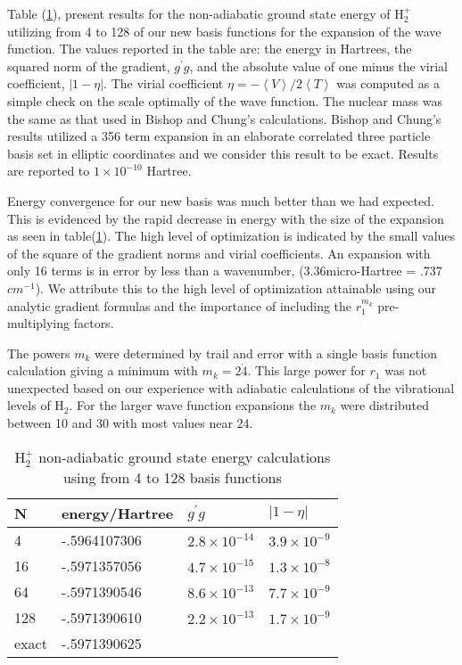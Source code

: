 \documentclass[12pt]{article}
\begin{document}
Table (\ref{H2pRes}),  present results for the non-adiabatic ground state
energy of H$_{2}^{+}$ utilizing from 4 to 128 of our new basis functions for
the expansion of the wave function.  The values reported in the table are: the
energy in Hartrees, the squared norm of the gradient, $g^{\prime}g$, and the
absolute value of one minus the virial coefficient, $\left|  1-\eta\right|  $.
The virial coefficient $\eta=-\left\langle V\right\rangle /2\left\langle
T\right\rangle $ was computed as a simple check on the scale optimally of the
wave function.  The nuclear mass was the same as that used in Bishop and
Chung's\cite{Bishop77} calculations. Bishop and Chung's results utilized a 356
term expansion in an elaborate correlated three particle basis set in elliptic
coordinates and we consider this result to be exact. Results are reported to
$1\times10^{-10}$ Hartree.

Energy convergence for our new basis was much better than we had expected.
This is evidenced by the rapid decrease in energy with the size of the
expansion as seen in table(\ref{H2pRes}). The high level of optimization is
indicated by the small values of the square of the gradient norms and virial
coefficients.  An expansion with only 16 terms is in error by less than a
wavenumber, (3.36micro-Hartree = .737$cm^{-1}$). We attribute this to the high
level of optimization attainable using our analytic gradient formulas and the
importance of including the $r_{1}^{m_{k}}$ pre-multiplying factors. 

The powers $m_{k}$ were determined by trail and error with a single basis
function calculation giving a minimum with $m_{k}=2\dot{4}$. This large power
for $r_{1}$ was not unexpected based on our experience with adiabatic
calculations of the vibrational levels of H$_{2}$\cite{Kinghorn97b}. For the
larger wave function expansions the $m_{k}$ were distributed between 10 and 30
with most values near 24. %

\begin{table}[p] \centering
\begin{tabular}
[c]{llll}\hline\hline
N & energy/Hartree & $g^{\prime}g$ & $\left|  1-\eta\right|  $\\\hline
4 & -.5964107306 & $2.8\times10^{-14}$ & $3.9\times10^{-9}$\\
16 & -.5971357056 & $4.7\times10^{-15}$ & $1.3\times10^{-8}$\\
64 & -.5971390546 & $8.6\times10^{-13}$ & $7.7\times10^{-9}$\\
128 & -.5971390610 & $2.2\times10^{-13}$ & $1.7\times10^{-9}$\\
exact\cite{Bishop77} & -.5971390625 &  & \\\hline\hline
\end{tabular}
\caption{H$_{2}^{+}%
$  non-adiabatic ground state energy calculations using from 4 to 128 basis functions
\label{H2pRes}}%
\end{table}%
\end{document}
